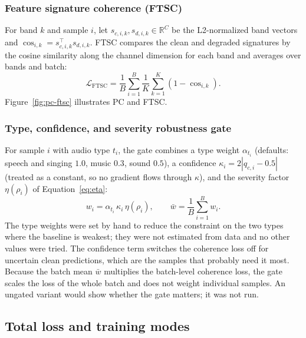 \subsubsection{Feature signature coherence (FTSC)}

For band $k$ and sample $i$, let $s_{c,i,k}, s_{d,i,k} \in \mathbb{R}^{C}$ be the L2-normalized band vectors and $\cos_{i,k} = s_{c,i,k}^\top s_{d,i,k}$. FTSC compares the clean and degraded signatures by the cosine similarity along the channel dimension for each band and averages over bands and batch:
\begin{equation}
\mathcal{L}_{\mathrm{FTSC}} = \frac{1}{B}\sum_{i=1}^{B} \frac{1}{K}\sum_{k=1}^{K} (1 - \cos_{i,k}).
\label{eq:ftsc}
\end{equation}
Figure~\ref{fig:pc-ftsc} illustrates PC and FTSC.


\subsubsection{Type, confidence, and severity robustness gate}

For sample $i$ with audio type $t_i$, the gate combines a type weight $\alpha_{t_i}$ (defaults: speech and singing $1.0$, music $0.3$, sound $0.5$), a confidence $\kappa_i = 2|q_{c,i} - 0.5|$ (treated as a constant, so no gradient flows through $\kappa$), and the severity factor $\eta(\rho_i)$ of Equation~\eqref{eq:eta}:
\begin{equation}
w_i = \alpha_{t_i}\,\kappa_i\,\eta(\rho_i), \qquad \bar{w} = \frac{1}{B}\sum_{i=1}^{B} w_i .
\label{eq:gate}
\end{equation}
The type weights were set by hand to reduce the constraint on the two types where the baseline is weakest; they were not estimated from data and no other values were tried. The confidence term switches the coherence loss off for uncertain clean predictions, which are the samples that probably need it most. Because the batch mean $\bar w$ multiplies the batch-level coherence loss, the gate scales the loss of the whole batch and does not weight individual samples. An ungated variant would show whether the gate matters; it was not run.

\subsection{Total loss and training modes}

